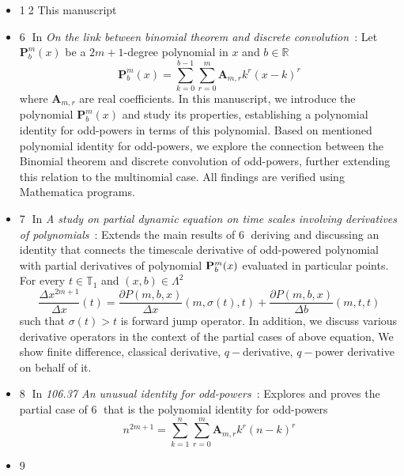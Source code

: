 \begin{itemize}
    \item {\Large \textcircled{\normalsize 12}} This manuscript
    \item {\Large \textcircled{\normalsize 6}}
    In \textit{On the link between binomial theorem and discrete convolution}~\cite{on_the_link_between_binomial_theorem_and_discrete_convolution}:
    Let $\mathbf{P}^{m}_{b}(x)$ be a $2m+1$-degree polynomial in $x$ and $b \in \mathbb{R}$
    \[
        \mathbf{P}^{m}_{b}(x) = \sum_{k=0}^{b-1} \sum_{r=0}^{m} \mathbf{A}_{m,r} k^r (x-k)^r
    \]
    where $\mathbf{A}_{m,r}$ are real coefficients.
    In this manuscript, we introduce the polynomial $\mathbf{P}^{m}_{b}(x)$ and study its properties,
    establishing a polynomial identity for odd-powers in terms of this polynomial.
    Based on mentioned polynomial identity for odd-powers,
    we explore the connection between the Binomial theorem and discrete convolution of odd-powers,
    further extending this relation to the multinomial case.
    All findings are verified using Mathematica programs.
    \item {\Large \textcircled{\normalsize 7}}
    In \textit{A study on partial dynamic equation on time scales involving derivatives
    of polynomials}~\cite{study_on_partial_dynamic_eq_on_time_scales_with_poly_derivatives}:
    Extends the main results of {\Large \textcircled{\normalsize 6}} deriving and discussing
    an identity that connects the timescale derivative of odd-powered polynomial
    with partial derivatives of polynomial ${\mathbf{P}}\sp{m} \sb{b}(x)$ evaluated in particular points.
    For every $t\in\mathbb{T}_1$ and $(x,b) \in \Lambda^2$
    \[
        \frac{\Delta x^{2m+1}}{\Delta x}(t) =
        \frac{\partial P(m,b,x)}{\Delta x} (m, \sigma(t), t) +
        \frac{\partial P(m,b,x)}{\Delta b} (m, t, t)
    \]
    such that $\sigma(t) > t$ is forward jump operator.
    In addition, we discuss various derivative operators in the context of the partial cases of above equation,
    We show finite difference, classical derivative, $q-$derivative, $q-$power derivative on behalf of it.
    \item {\Large \textcircled{\normalsize 8}}
    In \textit{106.37 An unusual identity for odd-powers}~\cite{unusual_identity_for_odd_powers}:
    Explores and proves the partial case of {\Large \textcircled{\normalsize 6}}
    that is the polynomial identity for odd-powers
    \[
        n^{2m+1} = \sum_{k=1}^{n} \sum_{r=0}^{m} \mathbf{A}_{m,r} k^r (n-k)^r
    \]
    \item {\Large \textcircled{\normalsize 9}}

\end{itemize}
